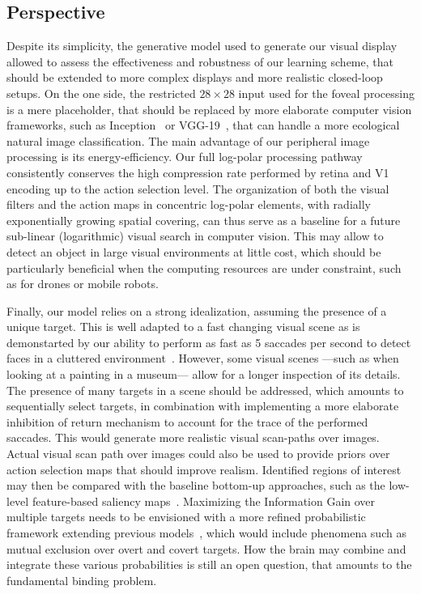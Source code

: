 \subsection{Perspective}

Despite its simplicity, the generative model used to generate our visual display allowed to assess the effectiveness and robustness of our learning scheme, that should be extended to more complex displays and more realistic closed-loop setups. On the one side, the restricted $28\times28$ input used for the foveal processing is a mere placeholder, that should be replaced by more elaborate computer vision frameworks, such as Inception~\cite{szegedy2015going} or VGG-19~\cite{simonyan2014very}, that can handle a more ecological natural image classification. The main advantage of our peripheral image processing is its energy-efficiency. Our full log-polar processing pathway consistently conserves the high compression rate performed by retina and V1 encoding up to the action selection level. The organization of both the visual filters and the action maps in concentric log-polar elements, with radially exponentially growing spatial covering, can thus serve as a baseline for a future sub-linear (logarithmic) visual search in computer vision.
This may allow to detect an object in large visual environments at little cost, which should be particularly beneficial when the computing resources are under constraint, such as for drones or mobile robots.

Finally, our model relies on a strong idealization, assuming the presence of a unique target. This is well adapted to a fast changing visual scene as is demonstarted by our ability to perform as fast as 5 saccades per second to detect faces in a cluttered environment~\cite{Martin18}. However, some visual scenes ---such as when looking at a painting in a museum--- allow for a longer inspection of its details.  The presence of many targets in a scene should be addressed, which amounts to sequentially select targets, in combination with implementing a more elaborate inhibition of return mechanism to account for the trace of the performed saccades. This would generate more realistic visual scan-paths over images. Actual visual scan path over images could also be used to provide priors over action selection maps that should improve realism.  Identified regions of interest may then be compared with the baseline bottom-up approaches, such as the low-level feature-based saliency maps~\cite{Itti01}. Maximizing the Information Gain over multiple targets needs to be envisioned with a more refined probabilistic framework extending previous models~\cite{Friston12}, which would include phenomena such as mutual exclusion over overt and covert targets. How the brain may combine and integrate these various probabilities is still an open question, that amounts to the fundamental binding problem.

